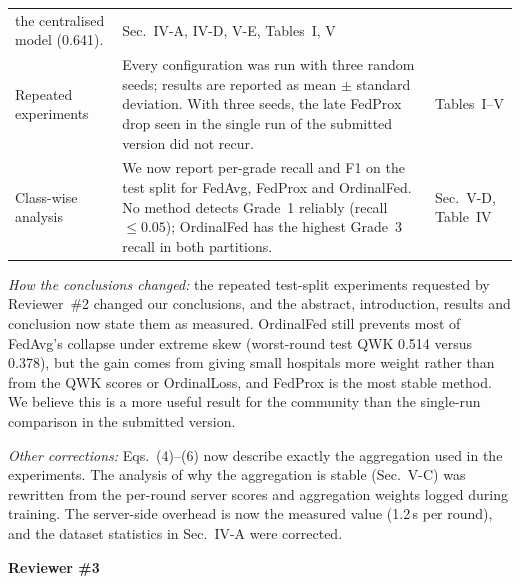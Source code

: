 \documentclass[10pt,a4paper]{article}
\begin{document}
{\begin{tabular}{@{}L{3.1cm}L{11.0cm}L{2.4cm}@{}}
the centralised model (0.641). &
Sec.~IV-A, IV-D, V-E, Tables~I, V \\
Repeated experiments &
Every configuration was run with three random seeds; results are reported as
mean $\pm$ standard deviation. With three seeds, the late FedProx drop seen in the
single run of the submitted version did not recur. &
Tables~I--V \\
Class-wise analysis &
We now report per-grade recall and F1 on the test split for FedAvg, FedProx and
OrdinalFed. No method detects Grade~1 reliably (recall $\leq 0.05$); OrdinalFed
has the highest Grade~3 recall in both partitions. &
Sec.~V-D, Table~IV \\
\bottomrule
\end{tabular}
}

\textit{How the conclusions changed:} the repeated test-split experiments requested
by Reviewer~\#2 changed our conclusions, and the abstract, introduction, results and
conclusion now state them as measured. OrdinalFed still prevents most of FedAvg's
collapse under extreme skew (worst-round test QWK 0.514 versus 0.378), but the gain
comes from giving small hospitals more weight rather than from the QWK scores or
OrdinalLoss, and FedProx is the most stable method. We believe this is a more useful
result for the community than the single-run comparison in the submitted version.

\textit{Other corrections:} Eqs.~(4)--(6) now describe exactly the aggregation used
in the experiments. The analysis of why the aggregation is stable (Sec.~V-C) was
rewritten from the per-round server scores and aggregation weights logged during
training. The server-side overhead is now the measured value (1.2\,s per round),
and the dataset statistics in Sec.~IV-A were corrected.

\textbf{Reviewer \#3}
\end{document}
